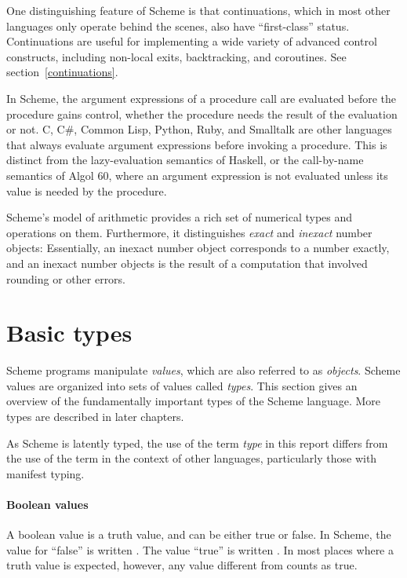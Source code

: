 \vest One distinguishing feature of Scheme is that continuations, which
in most other languages only operate behind the scenes, also have
``first-class'' status.  Continuations are useful for implementing a
wide variety of advanced control constructs, including non-local exits,
backtracking, and coroutines.  See section~\ref{continuations}.

In Scheme, the argument expressions of a procedure call are evaluated
before the procedure gains control, whether the procedure needs the
result of the evaluation or not.  C, C\#, Common Lisp, Python,
Ruby, and Smalltalk are other languages that always evaluate argument
expressions before invoking a procedure.  This is distinct from the
lazy-evaluation semantics of Haskell, or the call-by-name semantics of
Algol 60, where an argument expression is not evaluated unless its
value is needed by the procedure.

Scheme's model of arithmetic provides a rich set of numerical types
and operations on them.  Furthermore, it distinguishes \textit{exact}
and \textit{inexact} number objects: Essentially, an inexact number
object corresponds to a number exactly, and an inexact number objects
is the result of a computation that involved rounding or other errors.

\section{Basic types}

Scheme programs manipulate \textit{values}, which are also referred
to as \textit{objects}.
Scheme values are organized into sets of values called \textit{types}.
This section gives an overview of the fundamentally important types of the
Scheme language.  More types are described in later chapters.

\begin{note}
  As Scheme is latently typed, the use of the term \textit{type} in
  this report differs from the use of the term in the context of other
  languages, particularly those with manifest typing.
\end{note}

\paragraph{Boolean values}

A boolean value is a truth value, and can be either
true or false.  In Scheme, the value for ``false'' is written
\schfalse{}.  The value ``true'' is written \schtrue{}.  In
most places where a truth value is expected, however, any value different from
\schfalse{} counts as true.

